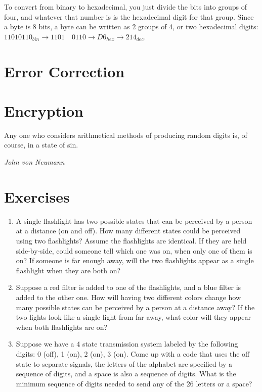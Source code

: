 To convert from binary to hexadecimal, you just divide the bits into groups of four, and whatever that number is is the hexadecimal digit for that group. Since a byte is 8 bits, a byte can be written as 2 groups of 4, or two hexadecimal digits: \(11010110_{bin} \rightarrow 1101\quad0110 \rightarrow D6_{hex} \rightarrow 214_{dec}\).

\section{Error Correction}



\section{Encryption}

\epigraph{Any one who considers arithmetical methods of producing random digits is, of course, in a state of sin.}{\textit{John von Neumann}}

\section{Exercises}

\begin{enumerate}
	\item A single flashlight has two possible states that can be perceived by a person at a distance (on and off). How many different states could be perceived using two flashlights? Assume the flashlights are identical. If they are held side-by-side, could someone tell which one was on, when only one of them is on? If someone is far enough away, will the two flashlights appear as a single flashlight when they are both on?
	
	\item Suppose a red filter is added to one of the flashlights, and a blue filter is added to the other one. How will having two different colors change how many possible states can be perceived by a person at a distance away? If the two lights look like a single light from far away, what color will they appear when both flashlights are on?
	
	\item Suppose we have a 4 state transmission system labeled by the following digits: 0 (off), 1 (on), 2 (on), 3 (on). Come up with a code that uses the off state to separate signals, the letters of the alphabet are specified by a sequence of digits, and a space is also a sequence of digits. What is the minimum sequence of digits needed to send any of the 26 letters or a space? 
\end{enumerate}